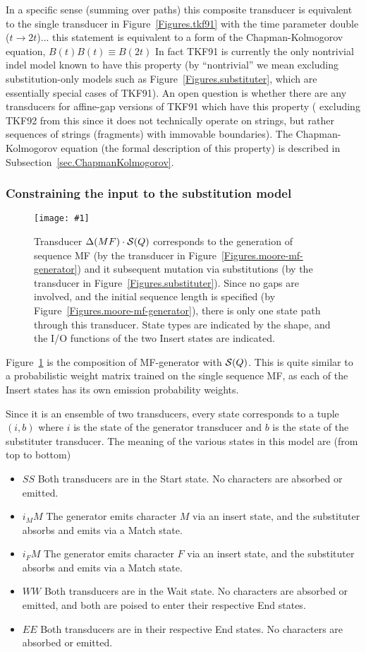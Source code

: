\documentclass{article}
\newcommand{\secref}[1]{Subsection~\ref{sec.#1}}
\newcommand{\figref}[1]{Figure~\ref{Figures.#1}}
\newcommand{\figlabel}[1]{\label{Figures.#1}}
\newcommand{\easyfig}[4]{
\begin{figure}
\texttt{[image: \#1]}
\caption{ \figlabel{#3} #4}
\end{figure}}
\newcommand{\pdffig}[2]{\easyfig{#1-fig.pdf}{}{#1}{#2}}
\newcommand\substitute{{\cal S}}
\newcommand\generate{\Delta}
\begin{document}
In a specific sense (summing over paths)
this composite transducer is equivalent to the single transducer in \figref{tkf91}
with the time parameter double ($t \to 2t$)...
this statement is equivalent to a form of the Chapman-Kolmogorov equation,
$B(t)B(t) \equiv B(2t)$
In fact TKF91 is currently the only nontrivial indel model known to have this property
(by ``nontrivial'' we mean excluding substitution-only models such as \figref{substituter},
which are essentially special cases of TKF91).
An open question is whether there are any transducers for affine-gap versions of TKF91 which
have this property
( excluding TKF92 from this since it does not technically operate on strings, but rather
sequences of strings (fragments) with immovable boundaries).  
The Chapman-Kolmogorov equation (the formal description of this property)
is described in \secref{ChapmanKolmogorov}.

\subsubsection{Constraining the input to the substitution model}
\pdffig{mf-substituter}{Transducer $\generate(MF) \cdot \substitute(Q)$
corresponds to the generation of sequence MF (by the transducer in \figref{moore-mf-generator})
and it subsequent mutation via substitutions (by the transducer in \figref{substituter}).
Since no gaps are involved, and the initial sequence length is specified (by \figref{moore-mf-generator}),
there is only one state path through this transducer.
State types are indicated by the shape, and the I/O functions of the two Insert states are indicated.  }

\figref{mf-substituter} is the composition of MF-generator with $\substitute(Q)$.  
This is quite similar to a probabilistic weight matrix trained on the single sequence MF,
as each of the Insert states has its own emission probability weights.

Since it is an ensemble of two transducers, every state corresponds to a tuple $(i,b)$
where
$i$ is the state of the generator transducer and
$b$ is the state of the substituter transducer.
The meaning of the various states in this model are (from top to bottom)
\begin{itemize}
\item $SS$ Both transducers are in the Start state.  No characters are  absorbed or emitted.
\item $i_MM$ The generator emits character $M$ via an insert state, and the substituter absorbs and emits via a Match state.
\item $i_FM$ The generator emits character $F$ via an insert state, and the substituter absorbs and emits via a Match state.
\item $WW$ Both transducers are in the Wait state.  No characters are  absorbed or emitted, and both are poised to enter their respective End states.
\item $EE$ Both transducers are in their respective End states. No characters are  absorbed or emitted.
\end{itemize}
\end{document}
